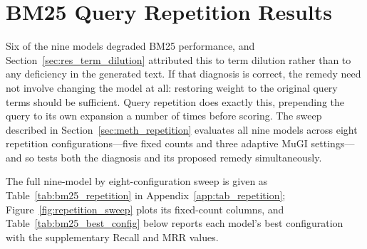 \section{BM25 Query Repetition Results}
\label{sec:res_repetition}

Six of the nine models degraded BM25 performance, and Section~\ref{sec:res_term_dilution} attributed this to term dilution rather than to any deficiency in the generated text. If that diagnosis is correct, the remedy need not involve changing the model at all: restoring weight to the original query terms should be sufficient. Query repetition does exactly this, prepending the query to its own expansion a number of times before scoring. The sweep described in Section~\ref{sec:meth_repetition} evaluates all nine models across eight repetition configurations---five fixed counts and three adaptive MuGI settings---and so tests both the diagnosis and its proposed remedy simultaneously.

The full nine-model by eight-configuration sweep is given as Table~\ref{tab:bm25_repetition} in Appendix~\ref{app:tab_repetition}; Figure~\ref{fig:repetition_sweep} plots its fixed-count columns, and Table~\ref{tab:bm25_best_config} below reports each model's best configuration with the supplementary Recall and MRR values.

